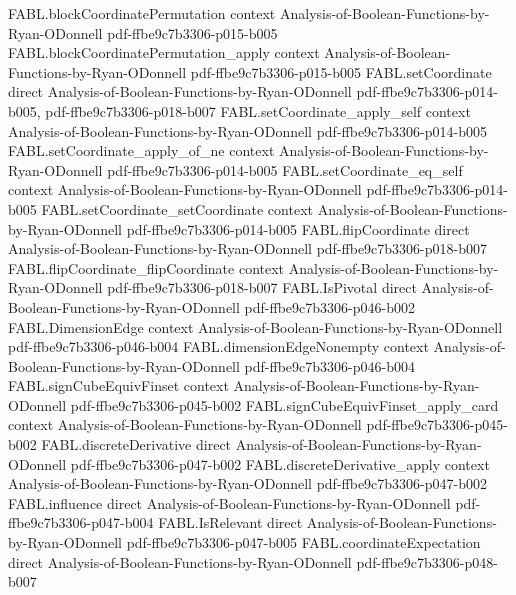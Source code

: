 \begin{theorem}
\proofstep
  {FABL.blockCoordinatePermutation}
  {context}
  {Analysis-of-Boolean-Functions-by-Ryan-ODonnell}
  {pdf-ffbe9c7b3306-p015-b005}
\proofstep
  {FABL.blockCoordinatePermutation_apply}
  {context}
  {Analysis-of-Boolean-Functions-by-Ryan-ODonnell}
  {pdf-ffbe9c7b3306-p015-b005}
\proofstep
  {FABL.setCoordinate}
  {direct}
  {Analysis-of-Boolean-Functions-by-Ryan-ODonnell}
  {pdf-ffbe9c7b3306-p014-b005,
    pdf-ffbe9c7b3306-p018-b007}
\proofstep
  {FABL.setCoordinate_apply_self}
  {context}
  {Analysis-of-Boolean-Functions-by-Ryan-ODonnell}
  {pdf-ffbe9c7b3306-p014-b005}
\proofstep
  {FABL.setCoordinate_apply_of_ne}
  {context}
  {Analysis-of-Boolean-Functions-by-Ryan-ODonnell}
  {pdf-ffbe9c7b3306-p014-b005}
\proofstep
  {FABL.setCoordinate_eq_self}
  {context}
  {Analysis-of-Boolean-Functions-by-Ryan-ODonnell}
  {pdf-ffbe9c7b3306-p014-b005}
\proofstep
  {FABL.setCoordinate_setCoordinate}
  {context}
  {Analysis-of-Boolean-Functions-by-Ryan-ODonnell}
  {pdf-ffbe9c7b3306-p014-b005}
\proofstep
  {FABL.flipCoordinate}
  {direct}
  {Analysis-of-Boolean-Functions-by-Ryan-ODonnell}
  {pdf-ffbe9c7b3306-p018-b007}
\proofstep
  {FABL.flipCoordinate_flipCoordinate}
  {context}
  {Analysis-of-Boolean-Functions-by-Ryan-ODonnell}
  {pdf-ffbe9c7b3306-p018-b007}
\proofstep
  {FABL.IsPivotal}
  {direct}
  {Analysis-of-Boolean-Functions-by-Ryan-ODonnell}
  {pdf-ffbe9c7b3306-p046-b002}
\proofstep
  {FABL.DimensionEdge}
  {context}
  {Analysis-of-Boolean-Functions-by-Ryan-ODonnell}
  {pdf-ffbe9c7b3306-p046-b004}
\proofstep
  {FABL.dimensionEdgeNonempty}
  {context}
  {Analysis-of-Boolean-Functions-by-Ryan-ODonnell}
  {pdf-ffbe9c7b3306-p046-b004}
\proofstep
  {FABL.signCubeEquivFinset}
  {context}
  {Analysis-of-Boolean-Functions-by-Ryan-ODonnell}
  {pdf-ffbe9c7b3306-p045-b002}
\proofstep
  {FABL.signCubeEquivFinset_apply_card}
  {context}
  {Analysis-of-Boolean-Functions-by-Ryan-ODonnell}
  {pdf-ffbe9c7b3306-p045-b002}
\proofstep
  {FABL.discreteDerivative}
  {direct}
  {Analysis-of-Boolean-Functions-by-Ryan-ODonnell}
  {pdf-ffbe9c7b3306-p047-b002}
\proofstep
  {FABL.discreteDerivative_apply}
  {context}
  {Analysis-of-Boolean-Functions-by-Ryan-ODonnell}
  {pdf-ffbe9c7b3306-p047-b002}
\proofstep
  {FABL.influence}
  {direct}
  {Analysis-of-Boolean-Functions-by-Ryan-ODonnell}
  {pdf-ffbe9c7b3306-p047-b004}
\proofstep
  {FABL.IsRelevant}
  {direct}
  {Analysis-of-Boolean-Functions-by-Ryan-ODonnell}
  {pdf-ffbe9c7b3306-p047-b005}
\proofstep
  {FABL.coordinateExpectation}
  {direct}
  {Analysis-of-Boolean-Functions-by-Ryan-ODonnell}
  {pdf-ffbe9c7b3306-p048-b007}
\proofstep

\end{theorem}

